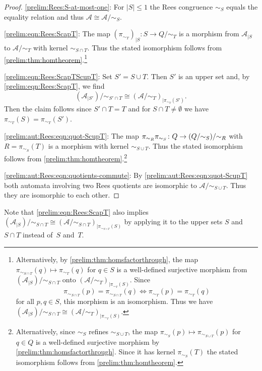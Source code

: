 \begin{proof}
\noindent\underline{\cref{prelim:Rees:S-at-most-one}}: For $|S| \le 1$
the Rees congruence $\sim_S$ equals the equality relation
and thus $\mathcal A \cong \mathcal A / {\sim_S}$.

\noindent\underline{\cref{prelim:eqn:Rees:ScapT}}: The map $( \pi_{\sim_T} )_{|S} \colon S \to Q / {\sim_T}$
is a morphism from $\mathcal A_{|S}$ to $\mathcal A / {\sim_T}$
with kernel $\sim_{S\cap T}$.
Thus the stated isomorphism follows from \cref{prelim:thm:homtheorem}.\footnote{Alternatively, 
	by \cref{prelim:thm:homsfactorthrough}, the map
	$
	\pi_{\sim_{S\cap T}}(q)\mapsto \pi_{\sim_T}(q)
	$
	for $q \in S$ is a well-defined surjective morphism from
	$(\mathcal A_{|S})/{\sim_{S\cap T}}$
	onto
	$(\mathcal A/{\sim_T})_{|\pi_{\sim_T}(S)}$.
	Since
	\[
	\pi_{\sim_{S\cap T}}(p)=\pi_{\sim_{S\cap T}}(q)
	\iff
	\pi_{\sim_T}(p)=\pi_{\sim_T}(q)
	\]
	for all $p,q\in S$, this morphism is an isomorphism.
	Thus we have $( \mathcal A_{|S} ) / {\sim_{S\cap T}} \cong  ( \mathcal A / {\sim_{T}} )_{|\pi_{\sim_{T}}(S)}$.}

\noindent\underline{\cref{prelim:eqn:Rees:ScapTScupT}}: Set $S' = S \cup T$.
Then $S'$ is an upper set and, by \cref{prelim:eqn:Rees:ScapT},
we find
\[
(\mathcal A_{|S'}) / {\sim_{S' \cap T}}  \cong  ( \mathcal A / {\sim_{T}} )_{|\pi_{\sim_{T}}(S')}.
\]
Then the claim follows
since $S' \cap T = T$
and for $S \cap T \ne \emptyset$ we have 
$\pi_{\sim_T}(S) = \pi_{\sim_T}(S')$.

\noindent\underline{\cref{prelim:aut:Rees:eqn:quot-ScupT}}: The map 
$\concat{\pi_{\sim_S}}{\pi_{\sim_R}} \colon Q \to ( Q / {\sim_S} ) / {\sim_R}$ with $R = \pi_{\sim_S}(T)$
is a morphism with kernel $\sim_{S\cup T}$.
Thus the stated isomorphism follows from \cref{prelim:thm:homtheorem}.\footnote{Alternatively,
since $\sim_{S}$ refines $\sim_{S\cup T}$,
the map $\pi_{\sim_S}(p) \mapsto \pi_{\sim_{S\cup T}}(p)$ for $q \in Q$
is a well-defined surjective morphism
by \cref{prelim:thm:homsfactorthrough}.
Since it has kernel $\pi_{\sim_S}(T)$
the stated isomorphism follows from \cref{prelim:thm:homtheorem}.}

\noindent\underline{\cref{prelim:aut:Rees:eqn:quotients-commute}}: 
By \cref{prelim:aut:Rees:eqn:quot-ScupT} both automata involving two Rees quotients
are isomorphic to $\mathcal A / {\sim_{S\cup T}}$. Thus they are isomorphic
to each other.
\end{proof}

Note that \cref{prelim:eqn:Rees:ScapT}
also implies 
$( \mathcal A_{|S} ) / {\sim_{S\cap T}} \cong ( \mathcal A / {\sim_{S\cap T}} )_{|\pi_{\sim_{S\cap T}}(S)}$
by applying it to the upper sets $S$ and $S \cap T$ instead of~$S$ and~$T$.


